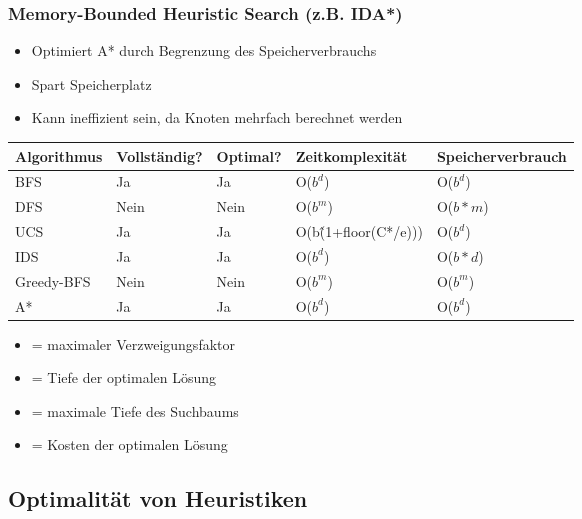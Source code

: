\subsubsection*{Memory-Bounded Heuristic Search (z.B. IDA*)}
\begin{itemize}
    \item Optimiert A* durch Begrenzung des Speicherverbrauchs
    \item {} Spart Speicherplatz
    \item {} Kann ineffizient sein, da Knoten mehrfach berechnet werden
\end{itemize}
\begin{table}[H]
    \centering
    \renewcommand{\arraystretch}{1.2}
    \begin{tabular}{lllll}
        \toprule
        Algorithmus & Vollständig? & Optimal? & Zeitkomplexität & Speicherverbrauch \\
        \midrule
        BFS & Ja & Ja & O($b^d$) & O($b^d$)\\
        DFS & Nein & Nein & O($b^m$) & O($b*m$)\\
        UCS & Ja & Ja & O(b\^(1+floor(C*/e))) & O($b^d$)\\
        IDS & Ja & Ja & O($b^d$) & O($b*d$)\\
        Greedy-BFS & Nein & Nein & O($b^m$) & O($b^m$)\\
        A* & Ja & Ja & O($b^d$) & O($b^d$)\\
        \bottomrule
    \end{tabular}
\end{table}
\begin{itemize}
    \item {} = maximaler Verzweigungsfaktor
    \item {} = Tiefe der optimalen Lösung
    \item {} = maximale Tiefe des Suchbaums
    \item {} = Kosten der optimalen Lösung
\end{itemize}

\subsection{Optimalität von Heuristiken}
